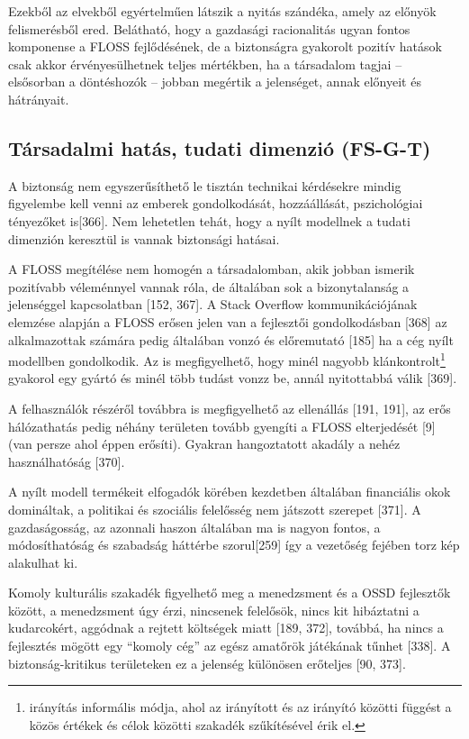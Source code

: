 \documentclass[12pt,magyar,a4paper,oneside]{scrreprt}
\begin{document}
Ezekből az elvekből egyértelműen látszik a nyitás szándéka, amely az
előnyök felismerésből ered. Belátható, hogy a gazdasági racionalitás
ugyan fontos komponense a FLOSS fejlődésének, de a biztonságra gyakorolt
pozitív hatások csak akkor érvényesülhetnek teljes mértékben, ha a
társadalom tagjai -- elsősorban a döntéshozók -- jobban megértik a
jelenséget, annak előnyeit és hátrányait.

\hypertarget{sec:FS-G-T}{%
\subsection{Társadalmi hatás, tudati dimenzió
(FS-G-T)}\label{sec:FS-G-T}}

A biztonság nem egyszerűsíthető le tisztán technikai kérdésekre mindig
figyelembe kell venni az emberek gondolkodását, hozzáállását,
pszichológiai tényezőket is{[}366{]}. Nem lehetetlen tehát, hogy a nyílt
modellnek a tudati dimenzión keresztül is vannak biztonsági hatásai.

A FLOSS megítélése nem homogén a társadalomban, akik jobban ismerik
pozitívabb véleménnyel vannak róla, de általában sok a bizonytalanság a
jelenséggel kapcsolatban {[}152, 367{]}. A Stack Overflow
kommunikációjának elemzése alapján a FLOSS erősen jelen van a fejlesztői
gondolkodásban {[}368{]} az alkalmazottak számára pedig általában vonzó
és előremutató {[}185{]} ha a cég nyílt modellben gondolkodik. Az is
megfigyelhető, hogy minél nagyobb klánkontrolt\footnote{irányítás
  informális módja, ahol az irányított és az irányító közötti függést a
  közös értékek és célok közötti szakadék szűkítésével érik el.}
gyakorol egy gyártó és minél több tudást vonzz be, annál nyitottabbá
válik {[}369{]}.

A felhasználók részéről továbbra is megfigyelhető az ellenállás {[}191,
191{]}, az erős hálózathatás pedig néhány területen tovább gyengíti a
FLOSS elterjedését {[}9{]} (van persze ahol éppen erősíti). Gyakran
hangoztatott akadály a nehéz használhatóság {[}370{]}.

A nyílt modell termékeit elfogadók körében kezdetben általában
financiális okok domináltak, a politikai és szociális felelősség nem
játszott szerepet {[}371{]}. A gazdaságosság, az azonnali haszon
általában ma is nagyon fontos, a módosíthatóság és szabadság háttérbe
szorul{[}259{]} így a vezetőség fejében torz kép alakulhat ki.

Komoly kulturális szakadék figyelhető meg a menedzsment és a OSSD
fejlesztők között, a menedzsment úgy érzi, nincsenek felelősök, nincs
kit hibáztatni a kudarcokért, aggódnak a rejtett költségek miatt {[}189,
372{]}, továbbá, ha nincs a fejlesztés mögött egy ``komoly cég'' az
egész amatőrök játékának tűnhet {[}338{]}. A biztonság-kritikus
területeken ez a jelenség különösen erőteljes {[}90, 373{]}.
\end{document}
